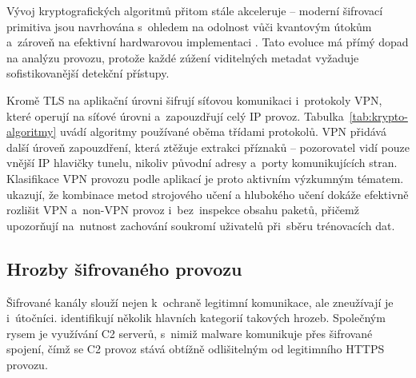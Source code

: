 Vývoj kryptografických algoritmů přitom stále akceleruje -- moderní šifrovací primitiva jsou navrhována s~ohledem na odolnost vůči kvantovým útokům a~zároveň na efektivní hardwarovou implementaci \parencite{Goswami2020}. Tato evoluce má přímý dopad na analýzu provozu, protože každé zúžení viditelných metadat vyžaduje sofistikovanější detekční přístupy.

Kromě TLS na aplikační úrovni šifrují síťovou komunikaci i~protokoly VPN, které operují na síťové úrovni a~zapouzdřují celý IP provoz. Tabulka~\ref{tab:krypto-algoritmy} uvádí algoritmy používané oběma třídami protokolů. VPN přidává další úroveň zapouzdření, která ztěžuje extrakci příznaků -- pozorovatel vidí pouze vnější IP hlavičky tunelu, nikoliv původní adresy a~porty komunikujících stran. Klasifikace VPN provozu podle aplikací je proto aktivním výzkumným tématem. \textcite{Almuhammadi2025} ukazují, že kombinace metod strojového učení a hlubokého učení dokáže efektivně rozlišit VPN a~non-VPN provoz i~bez~inspekce obsahu paketů, přičemž upozorňují na~nutnost zachování soukromí uživatelů při~sběru trénovacích dat.

\subsection{Hrozby šifrovaného provozu}
\label{sec:taxonomie-utoku}

Šifrované kanály slouží nejen k~ochraně legitimní komunikace, ale zneužívají je i~útočníci. \textcite{Ferdous2023} identifikují několik hlavních kategorií takových hrozeb. Společným rysem je využívání C2 serverů, s~nimiž malware komunikuje přes šifrované spojení, čímž se C2 provoz stává obtížně odlišitelným od legitimního HTTPS provozu.

